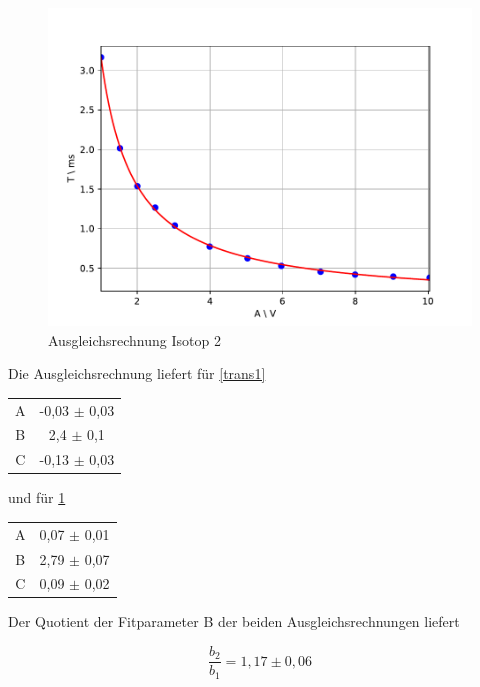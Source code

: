 \begin{figure}[h]
\centering
\includegraphics[scale=0.8]{img/trans2.pdf}
\caption{Ausgleichsrechnung Isotop 2}
\label{trans2}
\end{figure}

Die Ausgleichsrechnung liefert für \ref{trans1}
\begin{table}[h!]
\centering
\begin{tabular}{cc} \toprule
\centering
A & -0,03 $\pm$ 0,03 \\
B & 2,4 $\pm$ 0,1 \\
C & -0,13 $\pm$ 0,03 \\
\bottomrule
\end{tabular}
\end{table}

und für \ref{trans2}

\begin{table}[h!]
\centering
\begin{tabular}{cc} \toprule
\centering
A & 0,07 $\pm$ 0,01 \\
B & 2,79 $\pm$ 0,07 \\
C & 0,09 $\pm$ 0,02 \\
\bottomrule
\end{tabular}
\end{table}

Der Quotient der Fitparameter B der beiden Ausgleichsrechnungen liefert

\begin{equation}
\frac{b_{2}}{b_{1}} = 1,17 \pm 0,06
\end{equation}
